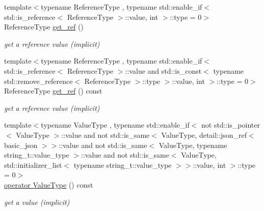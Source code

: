 \begin{DoxyCompactItemize}
{\footnotesize template$<$typename Reference\+Type , typename std\+::enable\+\_\+if$<$ std\+::is\+\_\+reference$<$ Reference\+Type $>$\+::value, int $>$\+::type  = 0$>$ }\\Reference\+Type \hyperlink{classnlohmann_1_1basic__json_afbd800010b67619463c0fce6e74f7878}{get\+\_\+ref} ()
\begin{DoxyCompactList}\small\item\em get a reference value (implicit) \end{DoxyCompactList}\item 
{\footnotesize template$<$typename Reference\+Type , typename std\+::enable\+\_\+if$<$ std\+::is\+\_\+reference$<$ Reference\+Type $>$\+::value and std\+::is\+\_\+const$<$ typename std\+::remove\+\_\+reference$<$ Reference\+Type $>$\+::type $>$\+::value, int $>$\+::type  = 0$>$ }\\Reference\+Type \hyperlink{classnlohmann_1_1basic__json_ac382f3d2bc6a5d52d936e4e40593f03b}{get\+\_\+ref} () const
\begin{DoxyCompactList}\small\item\em get a reference value (implicit) \end{DoxyCompactList}\item 
{\footnotesize template$<$typename Value\+Type , typename std\+::enable\+\_\+if$<$ not std\+::is\+\_\+pointer$<$ Value\+Type $>$\+::value and not std\+::is\+\_\+same$<$ Value\+Type, detail\+::json\+\_\+ref$<$ basic\+\_\+json $>$$>$\+::value and not std\+::is\+\_\+same$<$ Value\+Type, typename string\+\_\+t\+::value\+\_\+type $>$\+::value and not std\+::is\+\_\+same$<$ Value\+Type, std\+::initializer\+\_\+list$<$ typename string\+\_\+t\+::value\+\_\+type $>$$>$\+::value, int $>$\+::type  = 0$>$ }\\\hyperlink{classnlohmann_1_1basic__json_a1f1d4bc973c5b866db3d96e14d2c9f3f}{operator Value\+Type} () const
\begin{DoxyCompactList}\small\item\em get a value (implicit) \end{DoxyCompactList}\end{DoxyCompactItemize}
